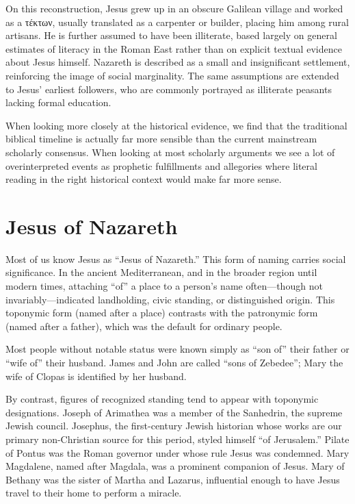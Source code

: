 On this reconstruction, Jesus grew up in an obscure Galilean village and worked as a τέκτων, usually translated as a carpenter or builder, placing him among rural artisans.
He is further assumed to have been illiterate, based largely on general estimates of literacy in the Roman East rather than on explicit textual evidence about Jesus himself.
Nazareth is described as a small and insignificant settlement, reinforcing the image of social marginality.
The same assumptions are extended to Jesus' earliest followers, who are commonly portrayed as illiterate peasants lacking formal education.

When looking more closely at the historical evidence, we find that the traditional biblical timeline is actually far more sensible than the current mainstream scholarly consensus.
When looking at most scholarly arguments we see a lot of overinterpreted events as prophetic fulfillments and allegories where literal reading in the right historical context would make far more sense.

\section{Jesus of Nazareth}\label{sec:jesus-of-nazareth}
Most of us know Jesus as ``Jesus of Nazareth.''
This form of naming carries social significance.
In the ancient Mediterranean, and in the broader region until modern times, attaching ``of'' a place to a person's name often---though not invariably---indicated landholding, civic standing, or distinguished origin.
This toponymic form (named after a place) contrasts with the patronymic form (named after a father), which was the default for ordinary people.

Most people without notable status were known simply as ``son of'' their father or ``wife of'' their husband.
James and John are called ``sons of Zebedee''; Mary the wife of Clopas is identified by her husband.

By contrast, figures of recognized standing tend to appear with toponymic designations.
Joseph of Arimathea was a member of the Sanhedrin, the supreme Jewish council.
Josephus, the first-century Jewish historian whose works are our primary non-Christian source for this period, styled himself ``of Jerusalem.''
Pilate of Pontus was the Roman governor under whose rule Jesus was condemned.
Mary Magdalene, named after Magdala, was a prominent companion of Jesus.
Mary of Bethany was the sister of Martha and Lazarus, influential enough to have Jesus travel to their home to perform a miracle.

